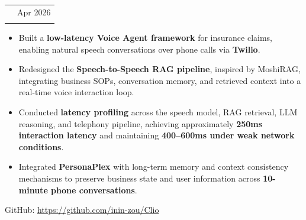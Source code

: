 \documentclass[a4paper,10pt]{article}
\makeatletter
\newcommand{\DetailFont}{\fontsize{9.5}{11.5}\selectfont}
\newlength{\EntryGap}
\newlength{\BulletGap}
\newlength{\HeadingToBullets}
\newenvironment{resumeBullets}{%
  \begin{itemize}[
    leftmargin=12pt,
    labelsep=5pt,
    label=\textbullet,
    itemsep=\BulletGap,
    parsep=0pt,
    topsep=\HeadingToBullets,
    partopsep=0pt
  ]
}{%
  \end{itemize}
}
\newcommand{\entry}[3]{%
  \Needspace{7\baselineskip}%
  \begin{tabularx}{\linewidth}{
    @{}
    >{\raggedright\arraybackslash}X
    @{\hspace{12pt}}
    r
    @{}
  }
    {\fontsize{11}{13}\selectfont\bfseries #1}
      & {\DetailFont #2}\\[2pt]
    \multicolumn{2}{@{}p{\linewidth}@{}}{
      {\fontsize{10}{12}\selectfont\itshape #3}
    }\\
  \end{tabularx}\par\nobreak
}
\newcommand{\projectLink}[1]{%
  {\DetailFont GitHub: \url{#1}\par}
}
\makeatother
\begin{document}
\vspace{\EntryGap}

\entry
  {Clio: Low-Latency Speech-to-Speech RAG framework}
  {Apr 2026}
  {Big Berlin Hack, Inca Track Winner}

\begin{resumeBullets}
  \item Built a \textbf{low-latency Voice Agent framework} for insurance claims, enabling natural speech conversations over phone calls via \textbf{Twilio}.

  \item Redesigned the \textbf{Speech-to-Speech RAG pipeline}, inspired by MoshiRAG, integrating business SOPs, conversation memory, and retrieved context into a real-time voice interaction loop.

  \item Conducted \textbf{latency profiling} across the speech model, RAG retrieval, LLM reasoning, and telephony pipeline, achieving approximately \textbf{250ms interaction latency} and maintaining \textbf{400--600ms under weak network conditions}.

  \item Integrated \textbf{PersonaPlex} with long-term memory and context consistency mechanisms to preserve business state and user information across \textbf{10-minute phone conversations}.
\end{resumeBullets}

\projectLink{https://github.com/inin-zou/Clio}

\end{document}
